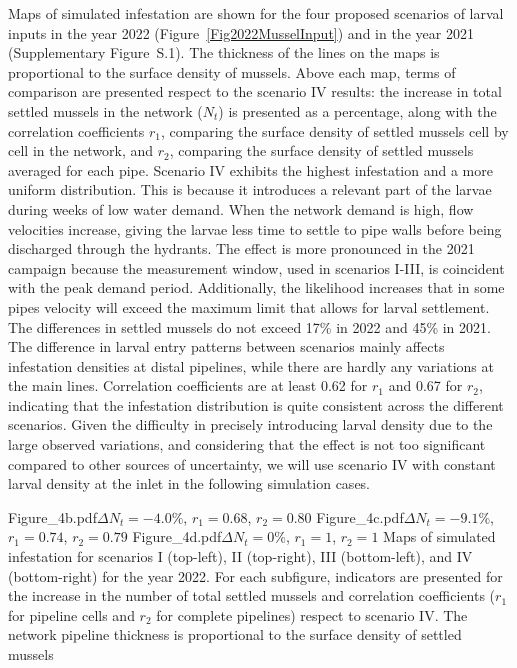 \documentclass[review,authoryear]{elsarticle}
\begin{document}
Maps of simulated infestation are shown for the four proposed scenarios of
larval inputs in the year 2022 (Figure~\ref{Fig2022MusselInput}) and in the year
2021 (Supplementary Figure~S.1). The thickness of the lines on the maps is
proportional to the surface density of mussels. Above each map, terms of
comparison are presented respect to the scenario IV results: the increase in
total settled mussels in the network ($N_t$) is presented as a percentage, along
with the correlation coefficients $r_1$, comparing the surface density of
settled mussels cell by cell in the network, and $r_2$, comparing the surface
density of settled mussels averaged for each pipe. Scenario IV exhibits the
highest infestation and a more uniform distribution. This is because it
introduces a relevant part of the larvae during weeks of low water demand. When
the network demand is high, flow velocities increase, giving the larvae less
time to settle to pipe walls before being discharged through the hydrants.
The effect is more pronounced in the 2021 campaign because the measurement
window, used in scenarios I-III, is coincident with the peak demand period.
Additionally, the likelihood increases that in some pipes velocity will exceed
the maximum limit that allows for larval settlement. The differences in settled
mussels do not exceed 17\% in 2022 and 45\% in 2021. The difference in larval
entry patterns between scenarios mainly affects infestation densities at distal
pipelines, while there are hardly any variations at the main lines. Correlation
coefficients are at least 0.62 for $r_1$ and 0.67 for $r_2$, indicating that the
infestation distribution is quite consistent across the different scenarios.
Given the difficulty in precisely introducing larval density due to the large
observed variations, and considering that the effect is not too significant
compared to other sources of uncertainty, we will use scenario IV with constant
larval density at the inlet in the following simulation cases.

{Figure_4b.pdf}{$\Delta N_t=-4.0\%$, $r_1=0.68$, $r_2=0.80$}
{Figure_4c.pdf}{$\Delta N_t=-9.1\%$, $r_1=0.74$, $r_2=0.79$}
{Figure_4d.pdf}{$\Delta N_t=0\%$, $r_1=1$, $r_2=1$}
{Maps of simulated infestation for scenarios I (top-left), II (top-right), III
(bottom-left), and IV (bottom-right) for the year 2022. For each subfigure,
indicators are presented for the increase in the number of total settled mussels
and correlation coefficients ($r_1$ for pipeline cells and $r_2$ for complete
pipelines) respect to scenario IV. The network pipeline thickness is
proportional to the surface density of settled
mussels\label{Fig2022MusselInput}}
\end{document}

